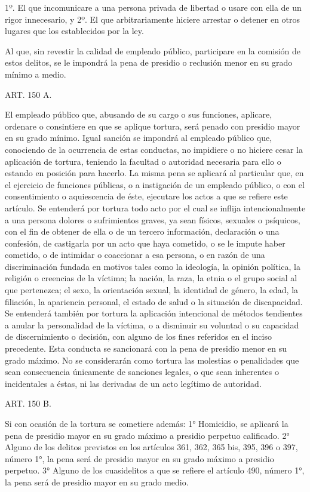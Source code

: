     1º. El que incomunicare a una persona privada de libertad o usare con ella de un rigor innecesario, y
    2º. El que arbitrariamente hiciere arrestar o detener en otros lugares que los establecidos por la ley.
   
    Al que, sin revestir la calidad de empleado público, participare en la comisión de estos delitos, se le impondrá la pena de presidio o reclusión menor en su grado mínimo a medio.

    ART. 150 A.

    El empleado público que, abusando de su cargo o sus funciones, aplicare, ordenare o consintiere en que se aplique tortura, será penado con presidio mayor en su grado mínimo. Igual sanción se impondrá al empleado público que, conociendo de la ocurrencia de estas conductas, no impidiere o no hiciere cesar la aplicación de tortura, teniendo la facultad o autoridad necesaria para ello o estando en posición para hacerlo.
    La misma pena se aplicará al particular que, en el ejercicio de funciones públicas, o a instigación de un empleado público, o con el consentimiento o aquiescencia de éste, ejecutare los actos a que se refiere este artículo.
    Se entenderá por tortura todo acto por el cual se inflija intencionalmente a una persona dolores o sufrimientos graves, ya sean físicos, sexuales o psíquicos, con el fin de obtener de ella o de un tercero información, declaración o una confesión, de castigarla por un acto que haya cometido, o se le impute haber cometido, o de intimidar o coaccionar a esa persona, o en razón de una discriminación fundada en motivos tales como la ideología, la opinión política, la religión o creencias de la víctima; la nación, la raza, la etnia o el grupo social al que pertenezca; el sexo, la orientación sexual, la identidad de género, la edad, la filiación, la apariencia personal, el estado de salud o la situación de discapacidad.
    Se entenderá también por tortura la aplicación intencional de métodos tendientes a anular la personalidad de la víctima, o a disminuir su voluntad o su capacidad de discernimiento o decisión, con alguno de los fines referidos en el inciso precedente. Esta conducta se sancionará con la pena de presidio menor en su grado máximo.
    No se considerarán como tortura las molestias o penalidades que sean consecuencia únicamente de sanciones legales, o que sean inherentes o incidentales a éstas, ni las derivadas de un acto legítimo de autoridad.

    ART. 150 B.

    Si con ocasión de la tortura se cometiere además:
    1° Homicidio, se aplicará la pena de presidio mayor en su grado máximo a presidio perpetuo calificado.
    2° Alguno de los delitos previstos en los artículos 361, 362, 365 bis, 395, 396 o 397, número 1°, la pena será de presidio mayor en su grado máximo a presidio perpetuo.
    3° Alguno de los cuasidelitos a que se refiere el artículo 490, número 1°, la pena será de presidio mayor en su grado medio.

